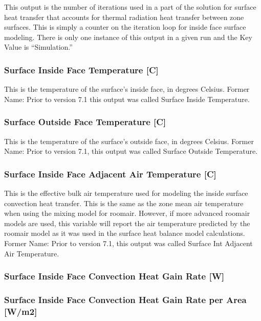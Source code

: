 This output is the number of iterations used in a part of the solution for surface heat transfer that accounts for thermal radiation heat transfer between zone surfaces. This is simply a counter on the iteration loop for inside face surface modeling. There is only one instance of this output in a given run and the Key Value is ``Simulation.''

\subsubsection{Surface Inside Face Temperature {[}C{]}}\label{surface-inside-face-temperature-c}

This is the temperature of the surface's inside face, in degrees Celsius. Former Name: Prior to version 7.1 this output was called Surface Inside Temperature.

\subsubsection{Surface Outside Face Temperature {[}C{]}}\label{surface-outside-face-temperature-c}

This is the temperature of the surface's outside face, in degrees Celsius. Former Name: Prior to version 7.1, this output was called Surface Outside Temperature.

\subsubsection{Surface Inside Face Adjacent Air Temperature {[}C{]}}\label{surface-inside-face-adjacent-air-temperature-c}

This is the effective bulk air temperature used for modeling the inside surface convection heat transfer. This is the same as the zone mean air temperature when using the mixing model for roomair. However, if more advanced roomair models are used, this variable will report the air temperature predicted by the roomair model as it was used in the surface heat balance model calculations. Former Name: Prior to version 7.1, this output was called Surface Int Adjacent Air Temperature.

\subsubsection{Surface Inside Face Convection Heat Gain Rate {[}W{]}}\label{surface-inside-face-convection-heat-gain-rate-w}

\subsubsection{Surface Inside Face Convection Heat Gain Rate per Area {[}W/m2{]}}\label{surface-inside-face-convection-heat-gain-rate-per-area-wm2}

